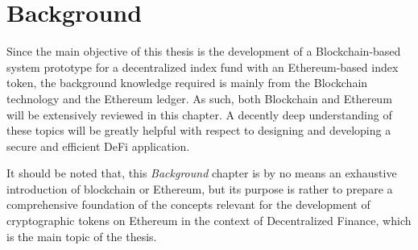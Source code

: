 
\chapter{Background}\label{chapter:Background}
Since the main objective of this thesis is the development of a Blockchain-based system prototype for a decentralized index fund with an Ethereum-based index token, the background knowledge required is mainly from the Blockchain technology and the Ethereum ledger. As such, both Blockchain and Ethereum will be extensively reviewed in this chapter. A decently deep understanding of these topics will be greatly helpful with respect to designing and developing a secure and efficient DeFi application.

It should be noted that, this \textit{Background} chapter is by no means an exhaustive introduction of blockchain or Ethereum, but its purpose is rather to prepare a comprehensive foundation of the concepts relevant for the development of cryptographic tokens on Ethereum in the context of Decentralized Finance, which is the main topic of the thesis.










